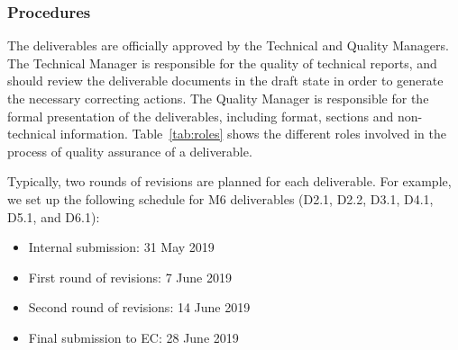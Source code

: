 \documentclass[a4paper,11pt]{article}
\begin{document}
\subsubsection{Procedures}

The deliverables are officially approved by the Technical and Quality Managers. The Technical Manager is responsible for the quality of technical reports, and should review the deliverable documents in the draft state in order to generate the necessary correcting actions. The Quality Manager is responsible for the formal presentation of the deliverables, including format, sections and non-technical information. Table~\ref{tab:roles} shows the different roles involved in the process of quality assurance of a deliverable.

Typically, two rounds of revisions are planned for each deliverable. For example,  we set up the following schedule for M6 deliverables (D2.1, D2.2, D3.1, D4.1, D5.1, and D6.1):

\begin{itemize}
\item Internal submission: 31 May 2019
\item First round of revisions: 7 June 2019
\item Second round of revisions: 14 June 2019
\item Final submission to EC: 28 June 2019
\end{itemize}
\end{document}
